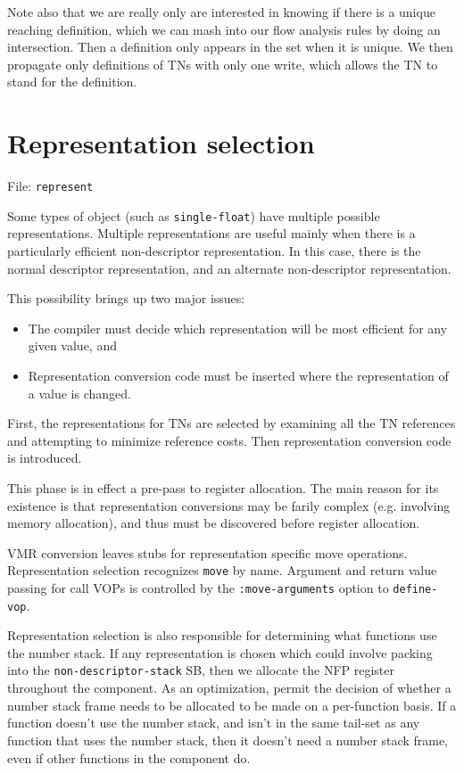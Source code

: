 Note also that we are really only are interested in knowing if there is a
unique reaching definition, which we can mash into our flow analysis rules by
doing an intersection.  Then a definition only appears in the set when it is
unique.  We then propagate only definitions of TNs with only one write, which
allows the TN to stand for the definition.


\chapter{Representation selection}

File: {\tt represent}

Some types of object (such as {\tt single-float}) have multiple possible
representations.  Multiple representations are useful mainly when there is a
particularly efficient non-descriptor representation.  In this case, there is
the normal descriptor representation, and an alternate non-descriptor
representation.

This possibility brings up two major issues:
\begin{itemize}
\item The compiler must decide which representation will be most efficient for
any given value, and

\item Representation conversion code must be inserted where the representation
of a value is changed.
\end{itemize}
First, the representations for TNs are selected by examining all the TN
references and attempting to minimize reference costs.  Then representation
conversion code is introduced.

This phase is in effect a pre-pass to register allocation.  The main reason for
its existence is that representation conversions may be farily complex (e.g.
involving memory allocation), and thus must be discovered before register
allocation.


VMR conversion leaves stubs for representation specific move operations.
Representation selection recognizes {\tt move} by name.  Argument and return
value passing for call VOPs is controlled by the {\tt :move-arguments} option
to {\tt define-vop}.

Representation selection is also responsible for determining what functions use
the number stack.  If any representation is chosen which could involve packing
into the {\tt non-descriptor-stack} SB, then we allocate the NFP register
throughout the component.  As an optimization, permit the decision of whether a
number stack frame needs to be allocated to be made on a per-function basis.
If a function doesn't use the number stack, and isn't in the same tail-set as
any function that uses the number stack, then it doesn't need a number stack
frame, even if other functions in the component do.

